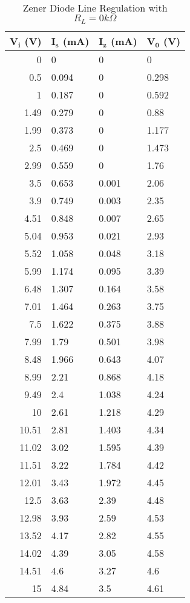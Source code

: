 \documentclass{scrartcl}
\newcommand{\1}{\mathbbm{1}}
\begin{document}
\begin{table}[!ht]
    \centering
    \begin{tabular}{|r|l|l|l|}
    \hline
         \textbf{$\pmb{V_i}$ (V)} & \textbf{$\pmb{I_s}$ (mA)} & \textbf{$\pmb{I_z}$ (mA)} 
		& \textbf{$\pmb{V_0}$ (V)} \\ \hline
         0 & 0 & 0 & 0 \\ \hline
         0.5 & 0.094 & 0 & 0.298 \\ \hline
         1 & 0.187 & 0 & 0.592 \\ \hline
         1.49 & 0.279 & 0 & 0.88 \\ \hline
         1.99 & 0.373 & 0 & 1.177 \\ \hline
         2.5 & 0.469 & 0 & 1.473 \\ \hline
         2.99 & 0.559 & 0 & 1.76 \\ \hline
         3.5 & 0.653 & 0.001 & 2.06 \\ \hline
         3.9 & 0.749 & 0.003 & 2.35 \\ \hline
         4.51 & 0.848 & 0.007 & 2.65 \\ \hline
         5.04 & 0.953 & 0.021 & 2.93 \\ \hline
         5.52 & 1.058 & 0.048 & 3.18 \\ \hline
         5.99 & 1.174 & 0.095 & 3.39 \\ \hline
         6.48 & 1.307 & 0.164 & 3.58 \\ \hline
         7.01 & 1.464 & 0.263 & 3.75 \\ \hline
         7.5 & 1.622 & 0.375 & 3.88 \\ \hline
         7.99 & 1.79 & 0.501 & 3.98 \\ \hline
         8.48 & 1.966 & 0.643 & 4.07 \\ \hline
         8.99 & 2.21 & 0.868 & 4.18 \\ \hline
         9.49 & 2.4 & 1.038 & 4.24 \\ \hline
         10 & 2.61 & 1.218 & 4.29 \\ \hline
         10.51 & 2.81 & 1.403 & 4.34 \\ \hline
         11.02 & 3.02 & 1.595 & 4.39 \\ \hline
         11.51 & 3.22 & 1.784 & 4.42 \\ \hline
         12.01 & 3.43 & 1.972 & 4.45 \\ \hline
         12.5 & 3.63 & 2.39 & 4.48 \\ \hline
         12.98 & 3.93 & 2.59 & 4.53 \\ \hline
         13.52 & 4.17 & 2.82 & 4.55 \\ \hline
         14.02 & 4.39 & 3.05 & 4.58 \\ \hline
         14.51 & 4.6 & 3.27 & 4.6 \\ \hline
         15 & 4.84 & 3.5 & 4.61 \\ \hline
    \end{tabular}
    \caption{Zener Diode Line Regulation with $R_L = 0 k\Omega$}
	\label{tab:ZD linereg}
\end{table} 
\end{document}
